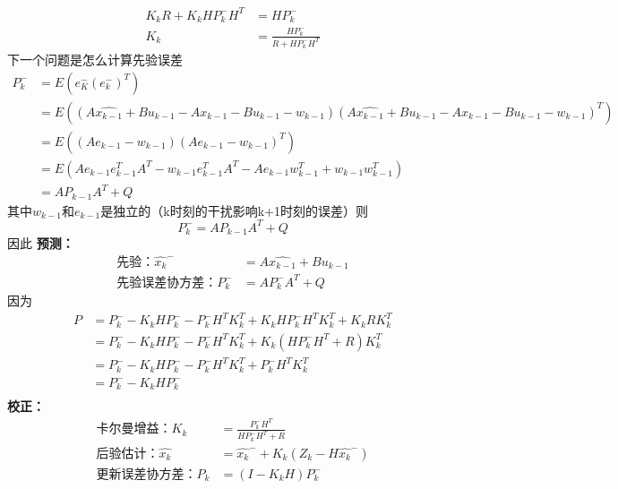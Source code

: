 \documentclass[12pt, a4paper, oneside]{ctexbook}
\begin{document}
\begin{align*}
    K_kR+K_kHP_k^-H^T&=HP_k^-\\
    K_k&=\frac{HP_k^-}{R+HP_k^-H^T}
\end{align*}
下一个问题是怎么计算先验误差
\begin{align*}
P_k^-&=E(e_K^-(e_k^-)^T)\\
     &=E((A\hat{x_{k-1}}+Bu_{k-1}-Ax_{k-1}-Bu_{k-1}-w_{k-1})(A\hat{x_{k-1}}+Bu_{k-1}-Ax_{k-1}-Bu_{k-1}-w_{k-1})^T)\\
     &=E((Ae_{k-1}-w_{k-1})(Ae_{k-1}-w_{k-1})^T)\\
     &=E(Ae_{k-1}e_{k-1}^TA^T-w_{k-1}e_{k-1}^TA^T-Ae_{k-1}w_{k-1}^T+w_{k-1}w_{k-1}^T)\\
     &=AP_{k-1}A^T+Q
\end{align*}
其中$w_{k-1}$和$e_{k-1}$是独立的（k时刻的干扰影响k+1时刻的误差）则
\begin{equation*}
P_k^-=AP_{k-1}A^T+Q
\end{equation*}
因此
\textbf{预测：}
\begin{align*}
    \text{先验：}\hat{x_k}^-&=A\hat{x_{k-1}}+Bu_{k-1}\\
    \text{先验误差协方差：}P_k^-&=AP_k^-A^T+Q
\end{align*}
因为
\begin{align*}
    P&=P_k^--K_kHP_k^--P_k^-H^TK_k^T+K_kHP_k^-H^TK_k^T+K_kRK_k^T\\
     &=P_k^--K_kHP_k^--P_k^-H^TK_k^T+K_k(HP_k^-H^T+R)K_k^T\\
     &=P_k^--K_kHP_k^--P_k^-H^TK_k^T+P_k^-H^TK_k^T\\
     &=P_k^--K_kHP_k^-\\
\end{align*}
\textbf{校正：}
\begin{align*}
    \text{卡尔曼增益：}K_k&=\frac{P_k^-H^T}{HP_k^-H^T+R}\\
    \text{后验估计：}\hat{x_k}&=\hat{x_k}^-+K_k(Z_k-H\hat{x_k}^-)\\
    \text{更新误差协方差：}P_k&=(I-K_kH)P_k^-
\end{align*}
\end{document}

